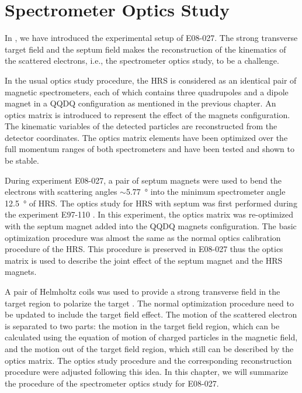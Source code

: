 
\chapter{Spectrometer Optics Study}
\label{C6}

In , we have introduced the experimental setup of E08-027. The strong transverse target field and the septum field makes the reconstruction of the kinematics of the scattered electrons, i.e., the spectrometer optics study, to be a challenge.

In the usual optics study procedure, the HRS is considered as an identical pair of magnetic spectrometers, each of which contains three quadrupoles and a dipole magnet in a QQDQ configuration as mentioned in the previous chapter. An optics matrix is introduced to represent the effect of the magnets configuration. The kinematic variables of the detected particles are reconstructed from the detector coordinates. The optics matrix elements have been optimized over the full momentum ranges of both spectrometers and have been tested and shown to be stable.

During experiment E08-027, a pair of septum magnets were used to bend the electrons with scattering angles $\sim$\SI{5.77}{\degree} into the minimum spectrometer angle \SI{12.5}{\degree} of HRS. The optics study for HRS with septum was first performed during the experiment E97-110 \cite{Sulkosky2005}. In this experiment, the optics matrix was re-optimized with the septum magnet added into the QQDQ magnets configuration. The basic optimization procedure was almost the same as the normal optics calibration procedure of the HRS. This procedure is preserved in E08-027 thus the optics matrix is used to describe the joint effect of the septum magnet and the HRS magnets.

A pair of Helmholtz coils was used to provide a strong transverse field in the target region to polarize the target \cite{Pierce2014}. The normal optimization procedure need to be updated to include the target field effect. The motion of the scattered electron is separated to two parts: the motion in the target field region, which can be calculated using the equation of motion of charged particles in the magnetic field, and the motion out of the target field region, which still can be described by the optics matrix. The optics study procedure and the corresponding reconstruction procedure were adjusted following this idea. In this chapter, we will summarize the procedure of the spectrometer optics study for E08-027.

